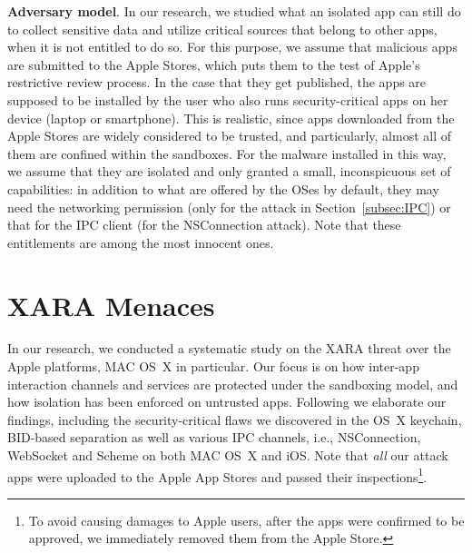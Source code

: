 \documentclass{article}
\newcommand{\ignore}[1]{}
\begin{document}
\vspace {3pt}\noindent\textbf{Adversary model}. In our research, we studied what an isolated app can still do to collect sensitive data and utilize critical sources that belong to other apps, when it is not entitled to do so. For this purpose, we assume that malicious apps are submitted to the Apple Stores, which puts them to the test of Apple's restrictive review process.  In the case that they get published, the apps are supposed to be installed by the user who also runs security-critical apps on her device (laptop or smartphone). This is realistic, since apps downloaded from the Apple Stores are widely considered to be trusted, and particularly, almost all of them are confined within the sandboxes.  For the malware installed in this way, we assume that they are isolated and only granted a small, inconspicuous set of capabilities: in addition to what are offered by the OSes by default, they may need the networking permission (only for the attack in Section~\ref{subsec:IPC}) or that for the IPC client (for the NSConnection attack). Note that these entitlements are among the most innocent ones\ignore{, given the fact that most apps nowadays require network connections and IPC has been extensively used}.

\vspace {-7pt}
\section{XARA Menaces}
\label{sec:attack}


In our research, we conducted a systematic study on the XARA threat over the Apple platforms, MAC OS~X in particular.\ignore{ Our purpose is to understand whether the current app isolation mechanisms can prevent unauthorized programs from accessing other apps' sensitive resources.  To this end,} Our focus is on how inter-app interaction channels and services are protected under the sandboxing model, and how isolation has been enforced on untrusted apps.\ignore{  Also we notice that oftentimes, the onus of resource protection can be on either the OS or the app: for example, in the case that some IPC channels turn out to be unguarded by the app sandbox, the developer could make up for this weakness by building into her app additional authentication and authorization, even though this has never been suggested by Apple.  Therefore, understanding of the significance of OS-level lapses also requires identifying and analyzing the apps affected by the problem\ignore{, to ensure that it is indeed vulnerable. This has been done in our research through automatic analysis of Apple apps' binary code (Section~\ref{sec:detectandmeasure})}.}  Following we elaborate our findings, including the security-critical flaws we discovered in the OS~X keychain, BID-based separation as well as various IPC channels, i.e., NSConnection, WebSocket and Scheme \ignore{weaknesses} on both MAC OS~X and iOS. Note that \textit{all} our attack apps were uploaded to the Apple App Stores and passed their inspections\footnote{\small To avoid causing damages to Apple users, \ignore{our apps do not include the attack payloads that send sensitive data out of a device. Also, }after the apps were confirmed to be approved, we immediately removed them from the Apple Store.}.
\end{document}
